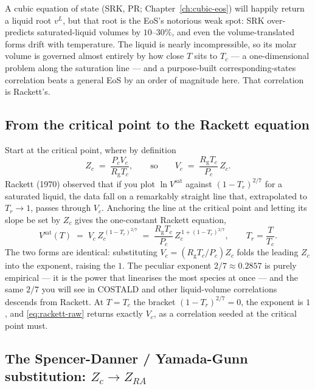 \documentclass[11pt,a4paper]{article}
\newcommand{\Rgas}{R_{\!\mathrm{g}}}                %
\begin{document}
A cubic equation of state (SRK, PR; Chapter~\ref{ch:cubic-eos}) will happily
return a liquid root $v^L$, but that root is the EoS's notorious weak
spot: SRK over-predicts saturated-liquid volumes by $10$--$30\%$, and
even the volume-translated forms drift with temperature.  The liquid is
nearly incompressible, so its molar volume is governed almost entirely
by how close $T$ sits to $T_c$ --- a one-dimensional problem along the
saturation line --- and a purpose-built corresponding-states
correlation beats a general EoS by an order of magnitude here.  That
correlation is Rackett's.

\subsection{From the critical point to the Rackett equation}

Start at the critical point, where by definition
\begin{equation}
   Z_c \;=\; \frac{P_c V_c}{\Rgas T_c},
   \qquad\text{so}\qquad
   V_c \;=\; \frac{\Rgas T_c}{P_c}\,Z_c .
\end{equation}
Rackett (1970) observed that if you plot $\ln V^{\mathrm{sat}}$ against
$(1-T_r)^{2/7}$ for a saturated liquid, the data fall on a remarkably
straight line that, extrapolated to $T_r\to 1$, passes through $V_c$.
Anchoring the line at the critical point and letting its slope be set by
$Z_c$ gives the one-constant Rackett equation,
\begin{equation}\label{eq:rackett-raw}
   V^{\mathrm{sat}}(T)
   \;=\; V_c\,Z_c^{\,(1-T_r)^{2/7}}
   \;=\; \frac{\Rgas T_c}{P_c}\,Z_c^{\,1+(1-T_r)^{2/7}},
   \qquad T_r = \frac{T}{T_c} .
\end{equation}
The two forms are identical: substituting $V_c=(\Rgas T_c/P_c)Z_c$ folds
the leading $Z_c$ into the exponent, raising the $1$.  The peculiar
exponent $2/7\approx 0.2857$ is purely empirical --- it is the power
that linearises the most species at once --- and the same $2/7$ you will
see in COSTALD and other liquid-volume correlations descends from
Rackett.  At $T=T_c$ the bracket $(1-T_r)^{2/7}=0$, the exponent is $1$,
and \eqref{eq:rackett-raw} returns exactly $V_c$, as a correlation
seeded at the critical point must.

\subsection{The Spencer-Danner / Yamada-Gunn substitution: \texorpdfstring{$Z_c \to Z_{RA}$}{Zc to ZRA}}
\end{document}
